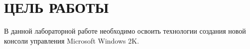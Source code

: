 \section{ЦЕЛЬ РАБОТЫ}

В данной лабораторной работе необходимо освоить технологии создания
новой консоли управления Microsoft Windows 2K.

\newpage
